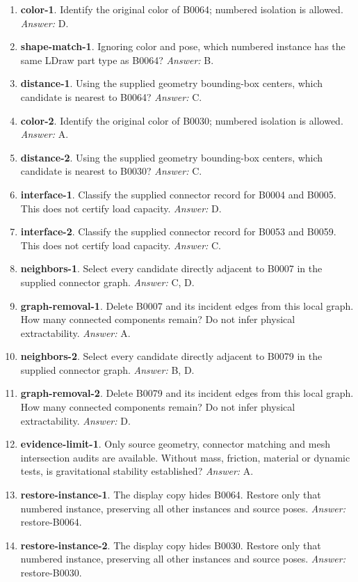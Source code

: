 \begin{enumerate}
\item \textbf{color-1}. Identify the original color of B0064; numbered isolation is allowed. \textit{Answer:} D.
\item \textbf{shape-match-1}. Ignoring color and pose, which numbered instance has the same LDraw part type as B0064? \textit{Answer:} B.
\item \textbf{distance-1}. Using the supplied geometry bounding-box centers, which candidate is nearest to B0064? \textit{Answer:} C.
\item \textbf{color-2}. Identify the original color of B0030; numbered isolation is allowed. \textit{Answer:} A.
\item \textbf{distance-2}. Using the supplied geometry bounding-box centers, which candidate is nearest to B0030? \textit{Answer:} C.
\item \textbf{interface-1}. Classify the supplied connector record for B0004 and B0005. This does not certify load capacity. \textit{Answer:} D.
\item \textbf{interface-2}. Classify the supplied connector record for B0053 and B0059. This does not certify load capacity. \textit{Answer:} C.
\item \textbf{neighbors-1}. Select every candidate directly adjacent to B0007 in the supplied connector graph. \textit{Answer:} C, D.
\item \textbf{graph-removal-1}. Delete B0007 and its incident edges from this local graph. How many connected components remain? Do not infer physical extractability. \textit{Answer:} A.
\item \textbf{neighbors-2}. Select every candidate directly adjacent to B0079 in the supplied connector graph. \textit{Answer:} B, D.
\item \textbf{graph-removal-2}. Delete B0079 and its incident edges from this local graph. How many connected components remain? Do not infer physical extractability. \textit{Answer:} D.
\item \textbf{evidence-limit-1}. Only source geometry, connector matching and mesh intersection audits are available. Without mass, friction, material or dynamic tests, is gravitational stability established? \textit{Answer:} A.
\item \textbf{restore-instance-1}. The display copy hides B0064. Restore only that numbered instance, preserving all other instances and source poses. \textit{Answer:} restore-B0064.
\item \textbf{restore-instance-2}. The display copy hides B0030. Restore only that numbered instance, preserving all other instances and source poses. \textit{Answer:} restore-B0030.
\end{enumerate}
\clearpage
